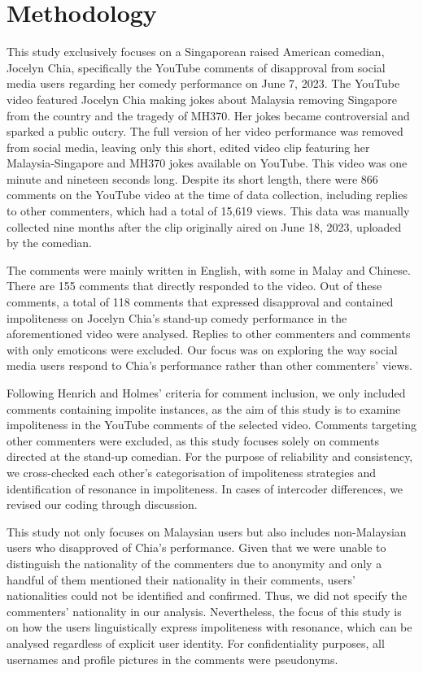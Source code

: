 \documentclass[english]{textolivre}
\begin{document}
\section{Methodology}
This study exclusively focuses on a Singaporean raised American comedian, Jocelyn Chia, specifically the YouTube comments of disapproval from social media users regarding her comedy performance on June 7, 2023. The YouTube video featured Jocelyn Chia making jokes about Malaysia removing Singapore from the country and the tragedy of MH370. Her jokes became controversial and sparked a public outcry. The full version of her video performance was removed from social media, leaving only this short, edited video clip featuring her Malaysia-Singapore and MH370 jokes available on YouTube. This video was one minute and nineteen seconds long. Despite its short length, there were 866 comments on the YouTube video at the time of data collection, including replies to other commenters, which had a total of 15,619 views. This data was manually collected nine months after the clip originally aired on June 18, 2023, uploaded by the comedian. 

The comments were mainly written in English, with some in Malay and Chinese. There are 155 comments that directly responded to the video. Out of these comments, a total of 118 comments that expressed disapproval and contained impoliteness on Jocelyn Chia’s stand-up comedy performance in the aforementioned video were analysed. Replies to other commenters and comments with only emoticons were excluded. Our focus was on exploring the way social media users respond to Chia’s performance rather than other commenters’ views.

Following Henrich and Holmes’ \citeyear{henrich2013} criteria for comment inclusion, we only included comments containing impolite instances, as the aim of this study is to examine impoliteness in the YouTube comments of the selected video. Comments targeting other commenters were excluded, as this study focuses solely on comments directed at the stand-up comedian. For the purpose of reliability and consistency, we cross-checked each other’s categorisation of impoliteness strategies and identification of resonance in impoliteness. In cases of intercoder differences, we revised our coding through discussion. 

This study not only focuses on Malaysian users but also includes non-Malaysian users who disapproved of Chia’s performance. Given that we were unable to distinguish the nationality of the commenters due to anonymity and only a handful of them mentioned their nationality in their comments, users’ nationalities could not be identified and confirmed. Thus, we did not specify the commenters’ nationality in our analysis. Nevertheless, the focus of this study is on how the users linguistically express impoliteness with resonance, which can be analysed regardless of explicit user identity. For confidentiality purposes, all usernames and profile pictures in the comments were pseudonyms.
\end{document}
